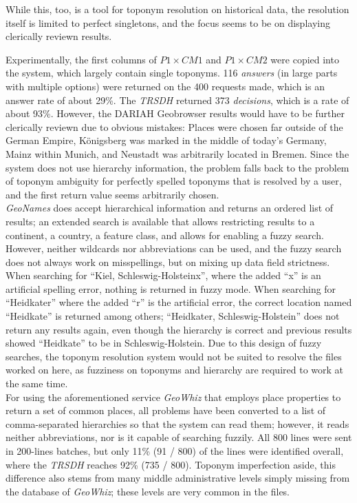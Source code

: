 \documentclass[11pt]{article}
\begin{document}
While this, too, is a tool for toponym resolution on historical data, the resolution itself is limited to perfect singletons, and the focus seems to be on displaying clerically reviewn results.

Experimentally, the first columns of $P1\times CM1$ and $P1\times CM2$ were copied into the system, which largely contain single toponyms. 116 \emph{answers} (in large parts with multiple options) were returned on the 400 requests made, which is an answer rate of about 29\%. The \emph{TRSDH} returned 373 \emph{decisions}, which is a rate of about 93\%. However, the DARIAH Geobrowser results would have to be further clerically reviewn due to obvious mistakes: Places were chosen far outside of the German Empire, Königsberg was marked in the middle of today's Germany, Mainz within Munich, and Neustadt was arbitrarily located in Bremen. Since the system does not use hierarchy information, the problem falls back to the problem of toponym ambiguity for perfectly spelled toponyms that is resolved by a user, and the first return value seems arbitrarily chosen.\\

\emph{GeoNames} does accept hierarchical information and returns an ordered list of results; an extended search is available that allows restricting results to a continent, a country, a feature class, and allows for enabling a fuzzy search. However, neither wildcards nor abbreviations can be used, and the fuzzy search does not always work on misspellings, but on mixing up data field strictness. When searching for ``Kiel, Schleswig-Holsteinx'', where the added ``x'' is an artificial spelling error, nothing is returned in fuzzy mode. When searching for ``Heidkater'' where the added ``r'' is the artificial error, the correct location named ``Heidkate'' is returned among others; ``Heidkater, Schleswig-Holstein'' does not return any results again, even though the hierarchy is correct and previous results showed ``Heidkate'' to be in Schleswig-Holstein. Due to this design of fuzzy searches, the toponym resolution system would not be suited to resolve the files worked on here, as fuzziness on toponyms and hierarchy are required to work at the same time.\\

For using the aforementioned service \emph{GeoWhiz} that employs place properties to return a set of common places, all problems have been converted to a list of comma-separated hierarchies so that the system can read them; however, it reads neither abbreviations, nor is it capable of searching fuzzily. All 800 lines were sent in 200-lines batches, but only 11\% (91 / 800) of the lines were identified overall, where the \emph{TRSDH} reaches 92\% (735 / 800). Toponym imperfection aside, this difference also stems from many middle administrative levels simply missing from the database of \emph{GeoWhiz}; these levels are very common in the files.\\
\end{document}
